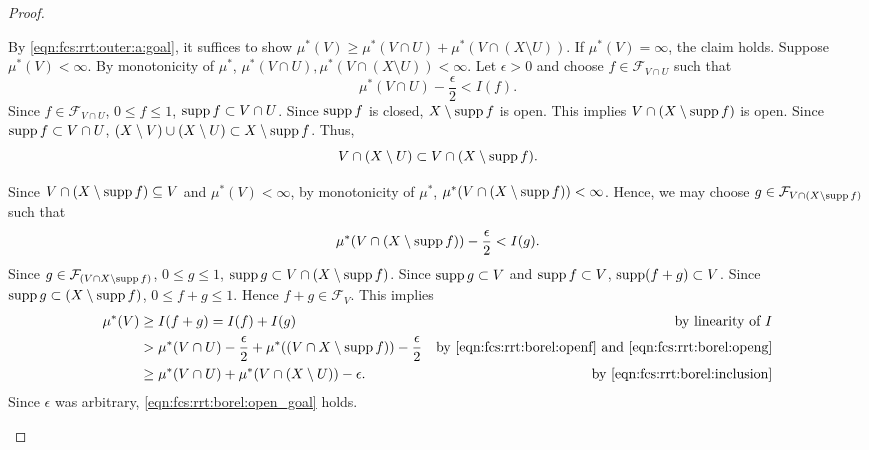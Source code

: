 \begin{proof}
\begin{step}
By \ref{eqn:fcs:rrt:outer:a:goal}, it suffices to show $ \mu^{\ast}(V) \geq \mu^{\ast}(V \cap U) + \mu^{\ast}(V \cap (X \setminus U))$. If $\mu^{\ast}(V) = \infty$, the claim holds. Suppose $\mu^{\ast}(V) < \infty$. By monotonicity of $\mu^{\ast}$, $\mu^{\ast}(V \cap U), \mu^{\ast}(V \cap (X \setminus U)) < \infty$. Let $\epsilon > 0$ and choose $f \in \mathcal{F}_{V \cap U}$ such that
\begin{equation}
    \label{eqn:fcs:rrt:borel:openf}
    \mu^{\ast} (V \cap U) - \frac{\epsilon}{2} < I(f).
\end{equation}
Since $f \in \mathcal{F}_{V \cap U}$, $0 \leq f \leq 1$, $\operatorname{supp} f \subset V \cap U$. Since $\operatorname{supp} f$ is closed, $X \setminus \operatorname{supp} f$ is open. This implies $V \cap (X \setminus \operatorname{supp} f)$ is open. Since $\operatorname{supp} f \subset V \cap U$,
$(X \setminus V) \cup (X \setminus U) \subset X \setminus \operatorname{supp} f$. Thus,
\begin{equation}
    \label{eqn:fcs:rrt:borel:inclusion}
    V \cap (X \setminus U) \subset V \cap (X \setminus \operatorname{supp} f).
\end{equation}

Since $V \cap (X \setminus \operatorname{supp} f)  \subseteq V$ and $\mu^{\ast}(V) < \infty$, by monotonicity of $\mu^{\ast}$, $\mu^{\ast}(V \cap (X \setminus \operatorname{supp} f)) < \infty$. Hence, we may choose $g \in \mathcal{F}_{V \cap (X \setminus \operatorname{supp} f) }$ such that \begin{equation}
    \label{eqn:fcs:rrt:borel:openg}
    \mu^{\ast} (V \cap (X \setminus \operatorname{supp} f)) - \frac{\epsilon}{2} < I(g).
\end{equation}
Since $g \in \mathcal{F}_{(V \cap X \setminus \operatorname{supp} f)}$, $0 \leq g \leq 1$, $\operatorname{supp} g \subset V \cap (X \setminus \operatorname{supp} f)$. Since $\operatorname{supp} g \subset V$ and $\operatorname{supp} f \subset V$, $\operatorname{supp} (f + g) \subset V$. Since $\operatorname{supp} g \subset (X \setminus \operatorname{supp} f)$, $0 \leq f + g \leq 1$. Hence $f + g \in \mathcal{F}_{V}$. This implies \begin{align*}
    \mu^{\ast} (V) &\geq I (f + g) = I(f) + I(g)  & \text{by linearity of $I$} \\
                   &> \mu^{\ast} (V \cap U) -  \frac{\epsilon}{2} + \mu^{\ast} ((V \cap X \setminus \operatorname{supp} f)) - \frac{\epsilon}{2} & \text {by \ref{eqn:fcs:rrt:borel:openf} and \ref{eqn:fcs:rrt:borel:openg}} \\
                   &\geq\mu^{\ast} (V \cap U) + \mu^{\ast} (V \cap (X \setminus U)) - \epsilon. & \text{by \ref{eqn:fcs:rrt:borel:inclusion}}
\end{align*}
Since $\epsilon$ was arbitrary, \ref{eqn:fcs:rrt:borel:open_goal} holds.
\end{step}


\end{proof}
